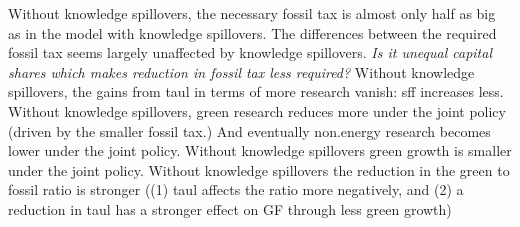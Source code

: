 \documentclass[12pt]{article}
\begin{document}
Without knowledge spillovers, the necessary fossil tax is almost only half as big as in the model with knowledge spillovers. 
The differences between the required fossil tax seems largely unaffected by knowledge spillovers. \textit{Is it unequal capital shares which makes reduction in fossil tax less required?} 
Without knowledge spillovers, the gains from taul in terms of more research vanish: sff increases less. Without knowledge spillovers, green research reduces more under the joint policy (driven by the smaller fossil tax.) And eventually non.energy research becomes lower under the joint policy. Without knowledge spillovers green growth is smaller under the joint policy. Without knowledge spillovers the reduction in the green to fossil ratio is stronger ((1) taul affects the ratio more negatively, and (2) a reduction in taul has a stronger effect on GF through less green growth)
\end{document}

